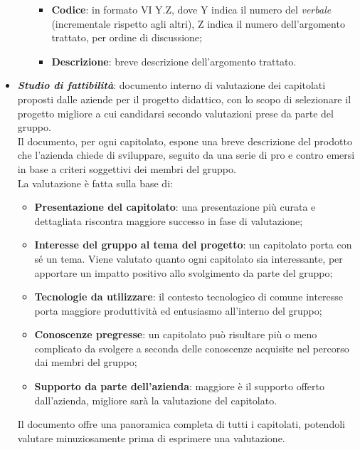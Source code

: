 \begin{itemize}
\begin{itemize}
                        \begin{itemize}
                              \item \textbf{Codice}: in formato VI Y.Z, dove Y indica il numero del \textit{verbale} (incrementale rispetto agli altri), Z indica il numero dell'argomento trattato, per ordine di discussione;
                              \item \textbf{Descrizione}: breve descrizione dell'argomento trattato.
                        \end{itemize}
            \end{itemize}
      \item \textit{\textbf{Studio di fattibilità}}: documento interno di valutazione dei capitolati proposti dalle aziende per il progetto didattico, con lo scopo di selezionare il progetto migliore a cui candidarsi secondo valutazioni
            prese da parte del gruppo.\\
            Il documento, per ogni capitolato, espone una breve descrizione del prodotto che l'azienda chiede di sviluppare, seguito da una serie di pro e contro emersi in base a criteri soggettivi dei membri del gruppo.
            \\La valutazione è fatta sulla base di:
            \begin{itemize}
                  \item \textbf{Presentazione del capitolato}: una presentazione più curata e dettagliata riscontra maggiore successo in fase di valutazione;
                  \item \textbf{Interesse del gruppo al tema del progetto}: un capitolato porta con sé un tema. Viene valutato quanto ogni capitolato sia interessante, per apportare un impatto positivo allo svolgimento da parte del gruppo;
                  \item \textbf{Tecnologie da utilizzare}: il contesto tecnologico di comune interesse porta maggiore produttività ed entusiasmo all'interno del gruppo;
                  \item \textbf{Conoscenze pregresse}: un capitolato può risultare più o meno complicato da svolgere a seconda delle conoscenze acquisite nel percorso dai membri del gruppo;
                  \item \textbf{Supporto da parte dell'azienda}: maggiore è il supporto offerto dall'azienda, migliore sarà la valutazione del capitolato.
            \end{itemize}
            Il documento offre una panoramica completa di tutti i capitolati, potendoli valutare minuziosamente prima di esprimere una valutazione.

\end{itemize}
